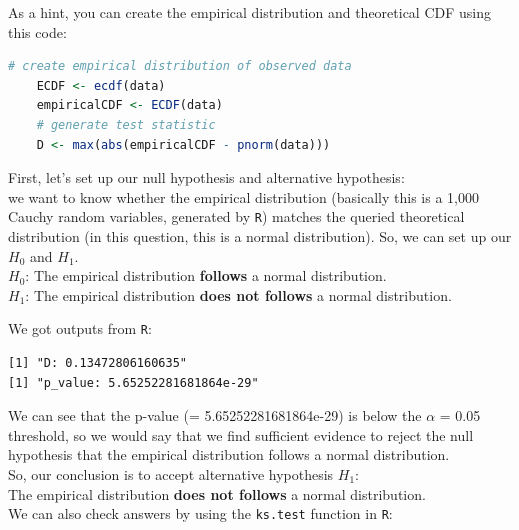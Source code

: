 \documentclass{article} %
\begin{document}
\noindent As a hint, you can create the empirical distribution and theoretical CDF using this code:

\begin{lstlisting}[language=R]
	# create empirical distribution of observed data
	ECDF <- ecdf(data)
	empiricalCDF <- ECDF(data)
	# generate test statistic
	D <- max(abs(empiricalCDF - pnorm(data))) 
\end{lstlisting}

\vspace{.7cm}

\noindent First, let’s set up our null hypothesis and alternative hypothesis: \\

\noindent we want to know whether the empirical distribution (basically this is a 1,000 Cauchy random variables, generated by \texttt{R}) matches the queried theoretical distribution (in this question, this is a normal distribution). So, we can set up our $H_0$ and $H_1$.\\

\noindent $H_0$: The empirical distribution \textbf{follows} a normal distribution.\\
\noindent $H_1$: The empirical distribution \textbf{does not follows} a normal distribution.\\

 

\vspace{.3cm}

\noindent We got outputs from \texttt{R}: 
\begin{verbatim}
[1] "D: 0.13472806160635"
[1] "p_value: 5.65252281681864e-29"
\end{verbatim}

\noindent We can see that the p-value (= 5.65252281681864e-29) is below the $\alpha$ = 0.05 threshold, so we would say that we find sufficient evidence to reject the null hypothesis that the empirical distribution follows a normal distribution.\\

\noindent So, our conclusion is to accept alternative hypothesis $H_1$: \\
\noindent The empirical distribution \textbf{does not follows} a normal distribution.\\

\noindent We can  also check answers by using the \texttt{ks.test} function in \texttt{R}:
\end{document}

